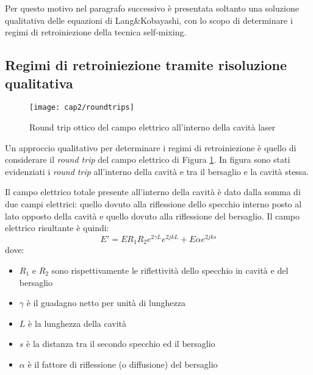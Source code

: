 Per questo motivo nel paragrafo successivo è presentata soltanto una soluzione qualitativa delle equazioni di Lang\&Kobayashi, con lo scopo di determinare i regimi di retroiniezione della tecnica self-mixing.

\subsection{Regimi di retroiniezione tramite risoluzione qualitativa}
\begin{figure}  
  \begin{center}
    \texttt{[image: cap2/roundtrips]}
    \caption{Round trip ottico del campo elettrico all'interno della cavità laser}
    \label{roundtrips}
  \end{center}
\end{figure}
Un approccio qualitativo per determinare i regimi di retroiniezione è quello di considerare il \textit{round trip} del campo elettrico di Figura \ref{roundtrips}. In figura sono stati evidenziati i \textit{round trip} all'interno della cavità e tra il bersaglio e la cavità stessa.

Il campo elettrico totale presente all'interno della cavità è dato dalla somma di due campi elettrici: quello dovuto alla riflessione dello specchio interno posto al lato opposto della cavità e quello dovuto alla riflessione del bersaglio. Il campo elettrico risultante è quindi:
\begin{equation}
	E'=ER_1R_2e^{2\gamma L}e^{2jkL}+E\alpha e^{2jks}
\end{equation}
dove:
\begin{itemize}
	\item $R_1$ e $R_2$ sono rispettivamente le riflettività dello specchio in cavità e del bersaglio
	\item $\gamma$ è il guadagno netto per unità di lunghezza
	\item $L$ è la lunghezza della cavità
	\item $s$ è la distanza tra il secondo specchio ed il bersaglio
	\item $\alpha$ è il fattore di riflessione (o diffusione) del bersaglio
\end{itemize}

